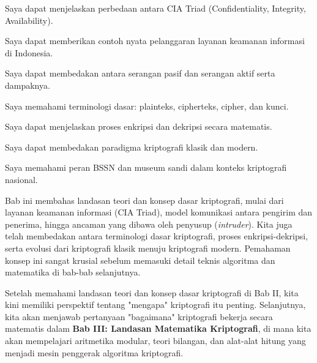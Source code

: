 \documentclass[main.tex]{subfiles}
\begin{document}
\begin{checklist}
  \item Saya dapat menjelaskan perbedaan antara CIA Triad (Confidentiality, Integrity, Availability).
  \item Saya dapat memberikan contoh nyata pelanggaran layanan keamanan informasi di Indonesia.
  \item Saya dapat membedakan antara serangan pasif dan serangan aktif serta dampaknya.
  \item Saya memahami terminologi dasar: plainteks, cipherteks, cipher, dan kunci.
  \item Saya dapat menjelaskan proses enkripsi dan dekripsi secara matematis.
  \item Saya dapat membedakan paradigma kriptografi klasik dan modern.
  \item Saya memahami peran BSSN dan museum sandi dalam konteks kriptografi nasional.
\end{checklist}


\begin{rangkuman}
Bab ini membahas landasan teori dan konsep dasar kriptografi, mulai dari layanan keamanan informasi (CIA Triad), model komunikasi antara pengirim dan penerima, hingga ancaman yang dibawa oleh penyusup (\textit{intruder}). Kita juga telah membedakan antara terminologi dasar kriptografi, proses enkripsi-dekripsi, serta evolusi dari kriptografi klasik menuju kriptografi modern. Pemahaman konsep ini sangat krusial sebelum memasuki detail teknis algoritma dan matematika di bab-bab selanjutnya.
\end{rangkuman}

\begin{transition}
Setelah memahami landasan teori dan konsep dasar kriptografi di Bab II, kita kini memiliki perspektif tentang "mengapa" kriptografi itu penting. Selanjutnya, kita akan menjawab pertanyaan "bagaimana" kriptografi bekerja secara matematis dalam \textbf{Bab III: Landasan Matematika Kriptografi}, di mana kita akan mempelajari aritmetika modular, teori bilangan, dan alat-alat hitung yang menjadi mesin penggerak algoritma kriptografi.
\end{transition}

\ifSubfilesClassLoaded{
  \renewcommand{\bibname}{Daftar Pustaka}
  
  
}{}
\end{document}
